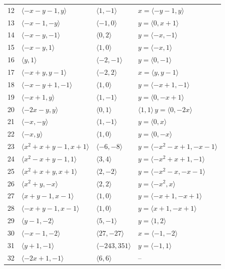 \documentclass[11pt]{article}
\begin{document}
\begin{longtable}{@{}rlll@{}}
12 & $\langle -x-y-1,y\rangle$ & $\langle 1,-1\rangle$ & $x=\langle -y-1,y\rangle$\\
13 & $\langle -x-1,-y\rangle$ & $\langle -1,0\rangle$ & $y=\langle 0,x+1\rangle$\\
14 & $\langle -x-y,-1\rangle$ & $\langle 0,2\rangle$ & $y=\langle -x,-1\rangle$\\
15 & $\langle -x-y,1\rangle$ & $\langle 1,0\rangle$ & $y=\langle -x,1\rangle$\\
16 & $\langle y,1\rangle$ & $\langle -2,-1\rangle$ & $y=\langle 0,-1\rangle$\\
17 & $\langle -x+y,y-1\rangle$ & $\langle -2,2\rangle$ & $x=\langle y,y-1\rangle$\\
18 & $\langle -x-y+1,-1\rangle$ & $\langle 1,0\rangle$ & $y=\langle -x+1,-1\rangle$\\
19 & $\langle -x+1,y\rangle$ & $\langle 1,-1\rangle$ & $y=\langle 0,-x+1\rangle$\\
20 & $\langle -2x-y,y\rangle$ & $\langle 0,1\rangle$ & $\langle 1,1\rangle\,y=\langle 0,-2x\rangle$\\
21 & $\langle -x,-y\rangle$ & $\langle 1,-1\rangle$ & $y=\langle 0,x\rangle$\\
22 & $\langle -x,y\rangle$ & $\langle 1,0\rangle$ & $y=\langle 0,-x\rangle$\\
23 & $\langle x^{2}+x+y-1,x+1\rangle$ & $\langle -6,-8\rangle$ & $y=\langle -x^{2}-x+1,-x-1\rangle$\\
24 & $\langle x^{2}-x+y-1,1\rangle$ & $\langle 3,4\rangle$ & $y=\langle -x^{2}+x+1,-1\rangle$\\
25 & $\langle x^{2}+x+y,x+1\rangle$ & $\langle 2,-2\rangle$ & $y=\langle -x^{2}-x,-x-1\rangle$\\
26 & $\langle x^{2}+y,-x\rangle$ & $\langle 2,2\rangle$ & $y=\langle -x^{2},x\rangle$\\
27 & $\langle x+y-1,x-1\rangle$ & $\langle 1,0\rangle$ & $y=\langle -x+1,-x+1\rangle$\\
28 & $\langle -x+y-1,x-1\rangle$ & $\langle 1,0\rangle$ & $y=\langle x+1,-x+1\rangle$\\
29 & $\langle y-1,-2\rangle$ & $\langle 5,-1\rangle$ & $y=\langle 1,2\rangle$\\
30 & $\langle -x-1,-2\rangle$ & $\langle 27,-27\rangle$ & $x=\langle -1,-2\rangle$\\
31 & $\langle y+1,-1\rangle$ & $\langle -243,351\rangle$ & $y=\langle -1,1\rangle$\\
32 & $\langle -2x+1,-1\rangle$ & $\langle 6,6\rangle$ & --\\

\end{longtable}
\end{document}
